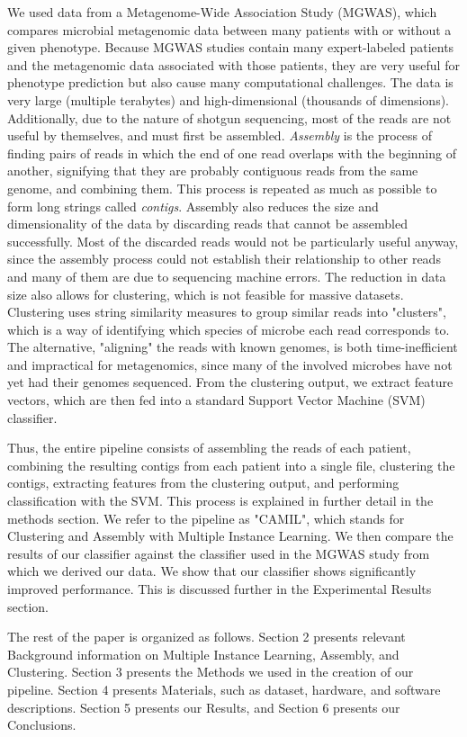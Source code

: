 We used data from a Metagenome-Wide Association Study (MGWAS), which compares microbial metagenomic data between many patients with or without a given phenotype. Because MGWAS studies contain many expert-labeled patients and the metagenomic data associated with those patients, they are very useful for phenotype prediction but also cause many computational challenges. The data is very large (multiple terabytes) and high-dimensional (thousands of dimensions). Additionally, due to the nature of shotgun sequencing, most of the reads are not useful by themselves, and must first be assembled. \emph{Assembly} is the process of finding pairs of reads in which the end of one read overlaps with the beginning of another, signifying that they are probably contiguous reads from the same genome, and combining them. This process is repeated as much as possible to form long strings called \emph{contigs}. Assembly also reduces the size and dimensionality of the data by discarding reads that cannot be assembled successfully. Most of the discarded reads would not be particularly useful anyway, since the assembly process could not establish their relationship to other reads and many of them are due to sequencing machine errors. The reduction in data size also allows for clustering, which is not feasible for massive datasets. Clustering uses string similarity measures to group similar reads into "clusters", which is a way of identifying which species of microbe each read corresponds to. The alternative, "aligning" the reads with known genomes, is both time-inefficient and impractical for metagenomics, since many of the involved microbes have not yet had their genomes sequenced. From the clustering output, we extract feature vectors, which are then fed into a standard Support Vector Machine (SVM) classifier. 

Thus, the entire pipeline consists of assembling the reads of each patient, combining the resulting contigs from each patient into a single file, clustering the contigs, extracting features from the clustering output, and performing classification with the SVM. This process is explained in further detail in the methods section. We refer to the pipeline as "CAMIL", which stands for Clustering and Assembly with Multiple Instance Learning. We then compare the results of our classifier against the classifier used in the MGWAS study from which we derived our data. We show that our classifier shows significantly improved performance. This is discussed further in the Experimental Results section.

The rest of the paper is organized as follows. Section 2 presents relevant Background information on  Multiple Instance Learning, Assembly, and Clustering. Section 3 presents the Methods we used in the creation of our pipeline. Section 4 presents Materials, such as dataset, hardware, and software descriptions. Section 5 presents our Results, and Section 6 presents our Conclusions.